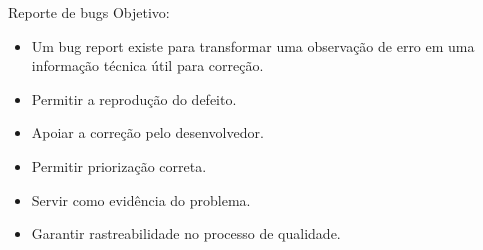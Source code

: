 
\begin{frame}{Reporte de bugs}
    Objetivo:
    \begin{itemize}
        \item Um bug report existe para transformar uma observação de erro em uma informação técnica útil para correção.
        \item Permitir a reprodução do defeito.
        \item Apoiar a correção pelo desenvolvedor.
        \item Permitir priorização correta.
        \item Servir como evidência do problema.
        \item Garantir rastreabilidade no processo de qualidade.
    \end{itemize}
\end{frame}